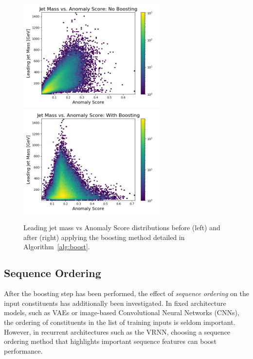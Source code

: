 \documentclass[11pt, a4paper]{article}
\begin{document}
\begin{figure}[H]
	\begin{center}
		\includegraphics[width=213pt]{imgs/ProcNoBoostPt_Background_July20_Background_July20_Weights_Leading_ConstOnly_Avg_M_vs_Score_ProcTest_SaveForPaper_Colorbar.png}
		\includegraphics[width=213pt]{imgs/ProcBoostPt_Background_July20_Background_July20_Weights_Leading_ConstOnly_Avg_M_vs_Score_ProcTest_SaveForPaper_Colorbar.png}
	\end{center}
	\caption{Leading jet mass vs Anomaly Score distributions before (left) and after (right) applying the boosting method detailed in Algorithm~\ref{alg:boost}.}
	\label{fig:mass_vs_score_boost}
\end{figure}


\subsection{Sequence Ordering}

After the boosting step has been performed, the effect of \textit{sequence ordering} on the input constituents has additionally been investigated. In fixed architecture models, such as VAEs or image-based Convolutional Neural Networks (CNNs), the ordering of constituents in the list of training inputs is seldom important. However, in recurrent architectures such as the VRNN, choosing a sequence ordering method that highlights important sequence features can boost performance.
 
\end{document}
